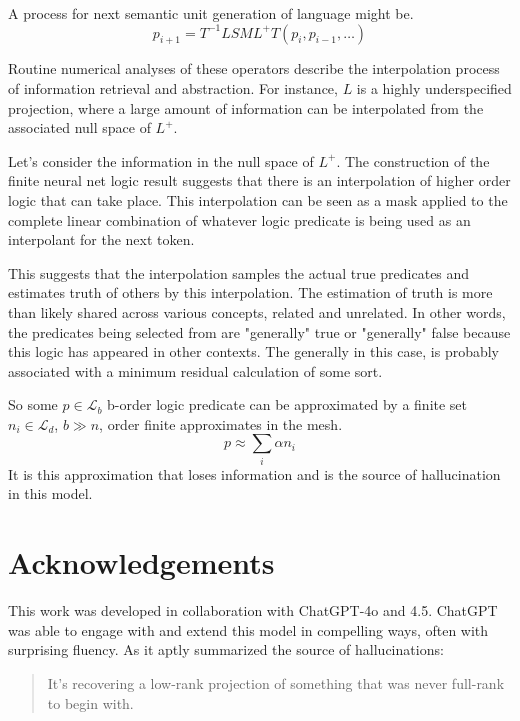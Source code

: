 \documentclass[12pt]{article}
\theoremstyle{plain}
\begin{document}
A process for next semantic unit generation of language might be.
$$
p_{i+1} = T^{-1} L S M  L^+ T (p_i,p_{i-1},\ldots)
$$

Routine numerical analyses of these operators describe the interpolation process of 
information retrieval and abstraction.  For instance, $L$ is a highly underspecified
projection, where a large amount of information can be interpolated from the 
associated null space of $L^+$.

Let's consider the information in the null space of $L^+$.  The construction of the
finite neural net logic result suggests that there is an interpolation of higher
order logic that can take place.  This interpolation can be seen as a mask
applied to the complete linear combination of whatever logic predicate is being
used as an interpolant for the next token.

This suggests that the interpolation samples the actual true predicates and estimates
truth of others by this interpolation.  The estimation of truth is more than likely
shared across various concepts, related and unrelated.  In other words, the predicates
being selected from are "generally" true or "generally" false because this logic
has appeared in other contexts.  The generally in this case, is probably associated
with a minimum residual calculation of some sort.

So some $p\in \mathcal{L}_b$ b-order logic predicate can be approximated by a finite set 
$n_i\in\mathcal{L}_d$, $b \gg n$,  order finite approximates in the mesh.
$$
p\approx\sum_i \alpha n_i
$$
It is this approximation that loses information and is the source of hallucination in
this model.

\section{Acknowledgements}

This work was developed in collaboration with ChatGPT-4o and 4.5. ChatGPT was 
able to engage with and extend this model in compelling ways, often with surprising 
fluency. As it aptly summarized the source of hallucinations:

\begin{quote}
It’s recovering a low-rank projection of something that was never full-rank to begin with.
\end{quote}
\end{document}
